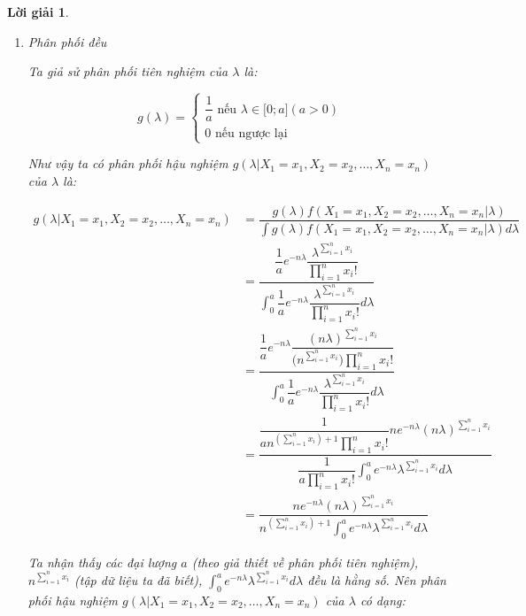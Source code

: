 \documentclass[14pt, a4paper]{article}
\theoremstyle{sltheorem}
\theoremstyle{soltheorem}
\newtheorem*{loigiai}{Lời giải}
\begin{document}
\begin{loigiai}
\begin{enumerate}
        \begin{enumerate}[label=(\alph*)]
            \item Phân phối đều
            
            Ta giả sử phân phối tiên nghiệm của $\lambda$ là:

            \begin{equation*}
                g(\lambda) = \begin{cases}
                    \dfrac{1}{a} \text{ nếu } \lambda \in \lbrack 0; a\rbrack (a > 0) \\
                    0 \text{ nếu ngược lại}
                \end{cases}
            \end{equation*}

            Như vậy ta có phân phối hậu nghiệm $g(\lambda \vert X_1 =x_1, X_2=x_2, \dots, X_n=x_n)$ của $\lambda$ là:

            \begin{equation*}
                \begin{aligned}
                    g(\lambda \vert X_1 =x_1, X_2=x_2, \dots, X_n=x_n) &= \dfrac{g(\lambda) f(X_1=x_1,X_2=x_2,\dots, X_n=x_n \vert \lambda)}{\int g(\lambda) f(X_1=x_1,X_2=x_2,\dots, X_n=x_n \vert \lambda) d \lambda} \\
                    &= \dfrac{\dfrac{1}{a} e^{-n\lambda} \dfrac{\lambda^{\sum_{i=1}^n x_i}}{\prod_{i=1}^n x_i!}}{\displaystyle\int_{0}^{a} \dfrac{1}{a} e^{-n\lambda} \dfrac{\lambda^{\sum_{i=1}^n x_i}}{\prod_{i=1}^n x_i!} d \lambda} \\
                    &= \dfrac{\dfrac{1}{a} e^{-n \lambda} \dfrac{(n\lambda)^{\sum_{i=1}^n x_i}}{\big(n^{\sum_{i=1}^n x_i}\big)\prod_{i=1}^n x_i!}}{\displaystyle\int_{0}^{a} \dfrac{1}{a} e^{-n\lambda} \dfrac{\lambda^{\sum_{i=1}^n x_i}}{\prod_{i=1}^n x_i!} d \lambda} \\
                    &= \dfrac{\dfrac{1}{a n^{(\sum_{i=1}^n x_i) + 1}\prod_{i=1}^n x_i !}  ne^{-n\lambda} (n\lambda)^{\sum_{i=1}^n x_i}}{\dfrac{1}{a \prod_{i=1}^n x_i!} \displaystyle \int_{0}^a e^{-n\lambda}\lambda^{\sum_{i=1}^n x_i}d\lambda} \\
                    &= \dfrac{n e^{-n\lambda}(n\lambda)^{\sum_{i=1}^n x_i}}{n^{(\sum_{i=1}^n x_i) + 1}\displaystyle\int_{0}^a e^{-n\lambda} \lambda^{\sum_{i=1}^n x_i}d\lambda}
                \end{aligned}
            \end{equation*}

            Ta nhận thấy các đại lượng $a$ (theo giả thiết về phân phối tiên nghiệm), $n^{\sum_{i=1}^n x_i}$  (tập dữ liệu ta đã biết), $\displaystyle\int_{0}^a e^{-n\lambda} \lambda^{\sum_{i=1}^n x_i}d\lambda$ đều là hằng số.
            Nên phân phối hậu nghiệm $g(\lambda \vert X_1 =x_1, X_2=x_2, \dots, X_n=x_n)$ của $\lambda$ có dạng:


\end{enumerate}
\end{enumerate}
\end{loigiai}
\end{document}
